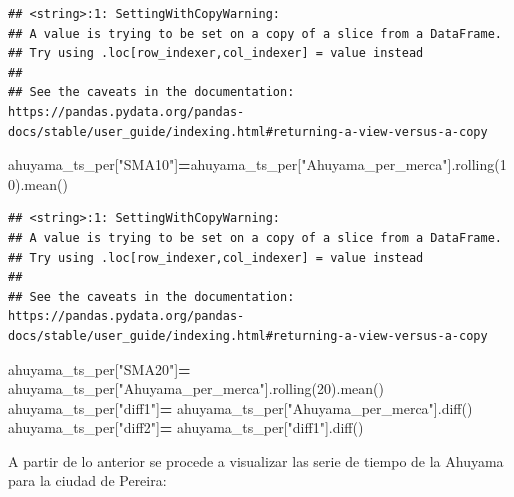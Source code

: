 \documentclass[
]{book}
\newenvironment{Shaded}{\begin{snugshade}}{\end{snugshade}}
\newcommand{\DecValTok}[1]{\textcolor[rgb]{0.00,0.00,0.81}{#1}}
\newcommand{\NormalTok}[1]{#1}
\newcommand{\OperatorTok}[1]{\textcolor[rgb]{0.81,0.36,0.00}{\textbf{#1}}}
\newcommand{\StringTok}[1]{\textcolor[rgb]{0.31,0.60,0.02}{#1}}
\begin{document}
\begin{verbatim}
## <string>:1: SettingWithCopyWarning: 
## A value is trying to be set on a copy of a slice from a DataFrame.
## Try using .loc[row_indexer,col_indexer] = value instead
## 
## See the caveats in the documentation: https://pandas.pydata.org/pandas-docs/stable/user_guide/indexing.html#returning-a-view-versus-a-copy
\end{verbatim}

\begin{Shaded}
\begin{Highlighting}[]
\NormalTok{ahuyama\_ts\_per[}\StringTok{"SMA10"}\NormalTok{]}\OperatorTok{=}\NormalTok{ahuyama\_ts\_per[}\StringTok{"Ahuyama\_per\_merca"}\NormalTok{].rolling(}\DecValTok{10}\NormalTok{).mean()}
\end{Highlighting}
\end{Shaded}

\begin{verbatim}
## <string>:1: SettingWithCopyWarning: 
## A value is trying to be set on a copy of a slice from a DataFrame.
## Try using .loc[row_indexer,col_indexer] = value instead
## 
## See the caveats in the documentation: https://pandas.pydata.org/pandas-docs/stable/user_guide/indexing.html#returning-a-view-versus-a-copy
\end{verbatim}

\begin{Shaded}
\begin{Highlighting}[]
\NormalTok{ahuyama\_ts\_per[}\StringTok{"SMA20"}\NormalTok{]}\OperatorTok{=}\NormalTok{ ahuyama\_ts\_per[}\StringTok{"Ahuyama\_per\_merca"}\NormalTok{].rolling(}\DecValTok{20}\NormalTok{).mean()}
\NormalTok{ahuyama\_ts\_per[}\StringTok{"diff1"}\NormalTok{]}\OperatorTok{=}\NormalTok{ ahuyama\_ts\_per[}\StringTok{"Ahuyama\_per\_merca"}\NormalTok{].diff()}
\NormalTok{ahuyama\_ts\_per[}\StringTok{"diff2"}\NormalTok{]}\OperatorTok{=}\NormalTok{ ahuyama\_ts\_per[}\StringTok{"diff1"}\NormalTok{].diff()}
\end{Highlighting}
\end{Shaded}

A partir de lo anterior se procede a visualizar las serie de tiempo de la Ahuyama para la ciudad de Pereira:
\end{document}
